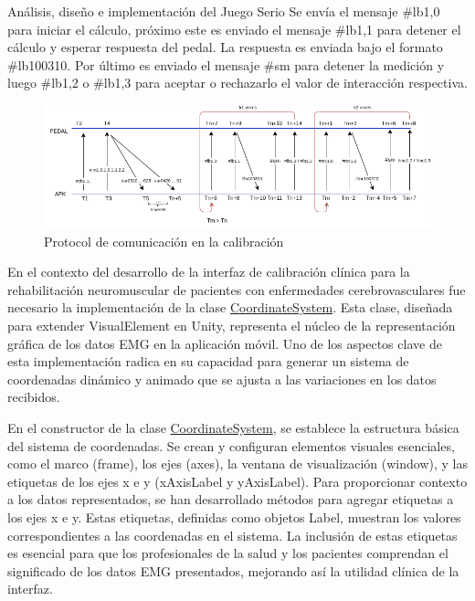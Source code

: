 \begin{thesischapter}{2} {Análisis, diseño e implementación del Juego Serio}
    \vspace{10pt}
    Se envía el mensaje \#lb1,0 para iniciar el cálculo, próximo este es enviado el mensaje  \#lb1,1 para 
    detener el cálculo y esperar respuesta del pedal. La respuesta es enviada bajo el formato  \#lb100310. 
    Por último es enviado el mensaje \#sm para detener la medición y luego \#lb1,2 o \#lb1,3 para aceptar 
     o rechazarlo el valor de interacción respectiva.  

    
    \begin{figure}[ht]
        \centering
        \includegraphics[scale=0.58]{images/diagram-protocol-in-calibration.png}
        \caption{Protocol de comunicación en la calibración}
        \label{fig: diagram-protocol-in-calibration}
    \end{figure}

    En el contexto del desarrollo de la interfaz de calibración clínica para la rehabilitación neuromuscular de pacientes con enfermedades cerebrovasculares
    fue necesario la implementación de la clase \underline{CoordinateSystem}. Esta clase, diseñada para extender VisualElement en Unity, representa el núcleo de la representación 
    gráfica de los datos EMG en la aplicación móvil. Uno de los aspectos clave de esta implementación 
    radica en su capacidad para generar un sistema de coordenadas dinámico y animado que se ajusta a las variaciones en los datos recibidos.

    \vspace{10pt}
    En el constructor de la clase \underline{CoordinateSystem}, se establece la estructura básica del sistema de coordenadas. Se crean y configuran elementos visuales esenciales, como el 
    marco (frame), los ejes (axes), la ventana de visualización (window), y las etiquetas de los ejes x e y (xAxisLabel y yAxisLabel). Para proporcionar contexto a los datos 
    representados, se han desarrollado métodos para agregar etiquetas a los ejes x e y. Estas etiquetas, definidas como objetos Label, muestran los 
    valores correspondientes a las coordenadas en el sistema. La inclusión de estas etiquetas es esencial para que los profesionales de la salud y los pacientes 
    comprendan el significado de los datos EMG presentados, mejorando así la utilidad clínica de la interfaz. 
    

\end{thesischapter}
